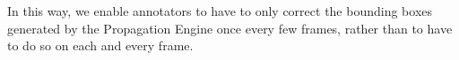In this way, we enable annotators to have to only correct the bounding boxes generated by the Propagation Engine once every few frames, rather than to have to do so on each and every frame.







